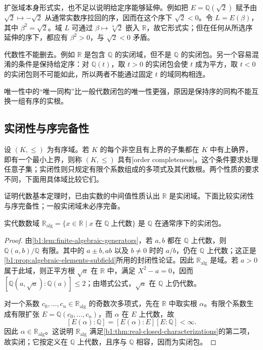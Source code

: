 扩张域本身形式实，也不足以说明给定序能够延伸。例如把 \(E=\mathbb Q(\sqrt2)\) 赋予由 \(\sqrt2\mapsto-\sqrt2\) 从通常实数序拉回的序，因而在这个序下 \(\sqrt2<0\)。令 \(L=E(\beta)\)，其中 \(\beta^2=\sqrt2\)。域 \(L\) 可通过 \(\beta\mapsto\sqrt[4]2\) 嵌入 \(\mathbb R\)，故它形式实；但在任何从所选序延伸的序下，都应有 \(\beta^2>0\)，与 \(\sqrt2<0\) 矛盾。

\ProseParagraphBreak
代数性不能删去。例如 \(\mathbb R\) 是包含 \(\mathbb Q\) 的实闭域，但不是 \(\mathbb Q\) 的实闭包。另一个容易混淆的条件是保持给定序：对 \(\mathbb Q(t)\)，取 \(t>0\) 的实闭包会使 \(t\) 成为平方，取 \(t<0\) 的实闭包则不可能如此，所以两者不能通过固定 \(t\) 的域同构相连。

\ProseParagraphBreak
唯一性中的“唯一同构”比一般代数闭包的唯一性更强，原因是保持序的同构不能互换一组有序的实根。

\subsection{实闭性与序完备性}
\label{b1:subsec:E02:03}

设 \((K,\leq)\) 为有序域。若 \(K\) 的每个非空且有上界的子集都在 \(K\) 中有上确界，即有一个最小上界，则称 \((K,\leq)\) 具有[order completeness]。这个条件要求处理任意子集；实闭性则只规定有限个系数组成的多项式及其代数根。两个性质的要求不同，下面用具体域比较它们。

\ProseParagraphBreak
证明代数基本定理时，已由实数的中间值性质认出 \(\mathbb R\) 是实闭域。下面比较实闭性与序完备性；一般实闭域未必序完备。

\begin{proposition}\label{b1:prop:real-algebraic-closure}
	实代数数域 \(\mathbb R_{\mathrm{alg}}=\{x\in\mathbb R\mid x\;\text{在}\;\mathbb Q\;\text{上代数}\}\) 是 \(\mathbb Q\) 在通常序下的实闭包。
\end{proposition}

\begin{proof}
	由\cref{b1:lem:finite-algebraic-generators}，若 \(a,b\) 都在 \(\mathbb Q\) 上代数，则 \(\mathbb Q(a,b)/\mathbb Q\) 有限。其中的 \(a\pm b,ab\) 以及 \(b\ne0\) 时的 \(a/b\)，仍在 \(\mathbb Q\) 上代数；这正是\cref{b1:prop:algebraic-elements-subfield}所用的封闭性论证。因此 \(\mathbb R_{\mathrm{alg}}\) 是域。若 \(a>0\) 属于此域，则正平方根 \(\sqrt a\) 在 \(\mathbb R\) 中，满足 \(X^2-a=0\)，因而 \([\mathbb Q(a,\sqrt a):\mathbb Q(a)]\leq2\)；由塔式公式，\(\sqrt a\) 在 \(\mathbb Q\) 上仍代数。

	对一个系数 \(c_0,\ldots,c_n\in\mathbb R_{\mathrm{alg}}\) 的奇数次多项式，先在 \(\mathbb R\) 中取实根 \(\alpha\)。有限个系数生成有限扩张 \(E=\mathbb Q(c_0,\ldots,c_n)\)，而 \(\alpha\) 在 \(E\) 上代数，故
	\[
		[E(\alpha):\mathbb Q]=[E(\alpha):E][E:\mathbb Q]<\infty.
	\]
	因此 \(\alpha\in\mathbb R_{\mathrm{alg}}\)。这说明 \(\mathbb R_{\mathrm{alg}}\) 满足\cref{b1:thm:real-closed-characterizations}的第二项，故实闭；它按定义在 \(\mathbb Q\) 上代数，且序与 \(\mathbb Q\) 相容，因而为实闭包。
\end{proof}

